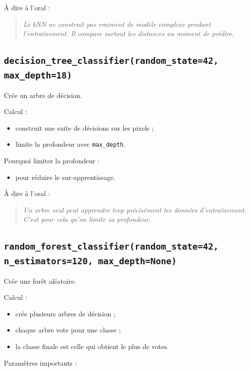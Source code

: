 \documentclass[11pt,a4paper]{article}
\begin{document}
À dire à l'oral :

\begin{quote}
\itshape Le kNN ne construit pas vraiment de modèle complexe pendant l'entraînement. Il compare surtout les distances au moment de prédire.
\end{quote}

\subsection{\texttt{decision\_tree\_classifier(random\_state=42, max\_depth=18)}}

Crée un arbre de décision.

Calcul :

\begin{itemize}
\item construit une suite de décisions sur les pixels ;
\item limite la profondeur avec \texttt{max\_depth}.
\end{itemize}

Pourquoi limiter la profondeur :

\begin{itemize}
\item pour réduire le sur-apprentissage.
\end{itemize}

À dire à l'oral :

\begin{quote}
\itshape Un arbre seul peut apprendre trop précisément les données d'entraînement. C'est pour cela qu'on limite sa profondeur.
\end{quote}

\subsection{\texttt{random\_forest\_classifier(random\_state=42, n\_estimators=120, max\_depth=None)}}

Crée une forêt aléatoire.

Calcul :

\begin{itemize}
\item crée plusieurs arbres de décision ;
\item chaque arbre vote pour une classe ;
\item la classe finale est celle qui obtient le plus de votes.
\end{itemize}

Paramètres importants :
\end{document}
